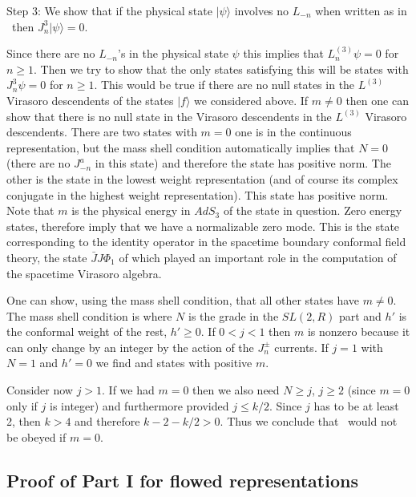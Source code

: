 \medskip
\noindent
Step 3: We show that if the physical state $| \psi \rangle$
 involves no $L_{-n}$ when
written as in \basis\ then $J^3_n | \psi \rangle =0$. 

 Since there are no $L_{-n}$'s in the physical state $\psi$ this
implies that $L^{(3)}_n \psi =0$ for $n\geq 1$. Then we try to show that
the only states satisfying this will be states with $J^3_n\psi =0$ for
$n\geq 1$. This would be true if there are no null states in the $L^{(3)}$
Virasoro
descendents of the states $|f\rangle$ we considered above.
If $m \not =0$ then one can show that there is no null state in the 
Virasoro descendents in the $L^{(3)}$ Virasoro descendents.
There are two states with $m=0$ one is in the continuous representation, 
but the mass shell condition automatically implies that $N=0$ (there
are no $J^a_{-n}$ in this state) and therefore the state has positive norm.
The other is the state in the lowest weight representation
 (and of course its complex conjugate in the
highest weight representation). This state has positive norm.
Note that $m$ is the physical energy in $AdS_3$ of the
state
in question. Zero  energy states, therefore imply that we have
a normalizable 
 zero mode.
This is the state corresponding to the identity operator in the
spacetime boundary conformal field theory, the state $\bar J J \Phi_1$ of 
\cite{Kutasov:1999xu} which played an important role in the 
computation of the spacetime Virasoro algebra. 

One can show, using the mass shell condition, that all other states
have $m\not =0$. 
The mass shell condition is
where $N$ is the grade in the $SL(2,R)$ part and $h'$ is the conformal weight
of the rest, $h' \geq 0$. If $0< j < 1$ then $m$ is nonzero because
it can only change by an integer by the action of the $J^\pm_n$ currents.
If $j=1$ with   $N=1$ and $h'=0$ we find \zeroen  and states with positive
$m$. 

Consider now $j>1$. If we had  $m=0$ then we also need   $N\geq j$, $j \geq
2$ (since $m=0$ only if $j $ is integer) and
furthermore
provided $j
\leq k/2 $. Since $j$ has to be at least 2, then $k>4$ and therefore
 $k-2-k/2 >0$. Thus we conclude
 that \massshell\ would not be obeyed if $m=0$.


\subsection{Proof of Part I for flowed representations}


